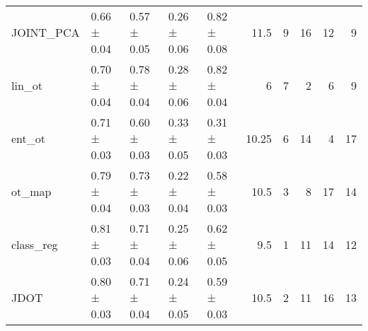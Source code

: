 \begin{tabular}{lllllrrrrr}
 JOINT\_PCA & 0.66 ± 0.04 & 0.57 ± 0.05 & 0.26 ± 0.06 & 0.82 ± 0.08 &         11.5  &                    9 &                     16 &              12 &                   9 \\
 lin\_ot    & 0.70 ± 0.04 & 0.78 ± 0.04 & 0.28 ± 0.06 & 0.82 ± 0.04 &          6    &                    7 &                      2 &               6 &                   9 \\
 ent\_ot    & 0.71 ± 0.03 & 0.60 ± 0.03 & 0.33 ± 0.05 & 0.31 ± 0.03 &         10.25 &                    6 &                     14 &               4 &                  17 \\
 ot\_map    & 0.79 ± 0.04 & 0.73 ± 0.03 & 0.22 ± 0.04 & 0.58 ± 0.03 &         10.5  &                    3 &                      8 &              17 &                  14 \\
 class\_reg & 0.81 ± 0.03 & 0.71 ± 0.04 & 0.25 ± 0.06 & 0.62 ± 0.05 &          9.5  &                    1 &                     11 &              14 &                  12 \\
 JDOT      & 0.80 ± 0.03 & 0.71 ± 0.04 & 0.24 ± 0.05 & 0.59 ± 0.03 &         10.5  &                    2 &                     11 &              16 &                  13 \\
\hline
\end{tabular}